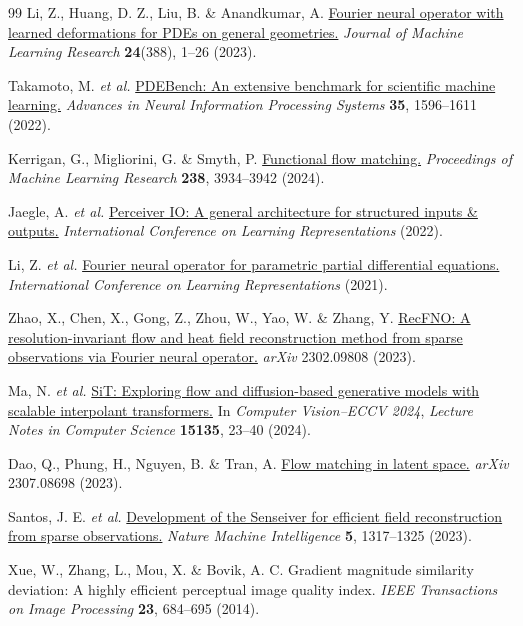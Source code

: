\documentclass[11pt]{article}
\begin{document}
\renewcommand{\refname}{Supplementary References}
{}
\begingroup
\small
\setlength{\parskip}{0pt}
\begin{thebibliography}{99}
 Li, Z., Huang, D. Z., Liu, B. \& Anandkumar, A. \href{https://www.jmlr.org/papers/v24/23-0064.html}{Fourier neural operator with learned deformations for PDEs on general geometries.} \emph{Journal of Machine Learning Research} \textbf{24}(388), 1--26 (2023).

 Takamoto, M. \emph{et al.} \href{https://arxiv.org/abs/2210.07182}{PDEBench: An extensive benchmark for scientific machine learning.} \emph{Advances in Neural Information Processing Systems} \textbf{35}, 1596--1611 (2022).

 Kerrigan, G., Migliorini, G. \& Smyth, P. \href{https://proceedings.mlr.press/v238/kerrigan24a.html}{Functional flow matching.} \emph{Proceedings of Machine Learning Research} \textbf{238}, 3934--3942 (2024).

 Jaegle, A. \emph{et al.} \href{https://arxiv.org/abs/2107.14795}{Perceiver IO: A general architecture for structured inputs \& outputs.} \emph{International Conference on Learning Representations} (2022).

 Li, Z. \emph{et al.} \href{https://openreview.net/forum?id=c8P9NQVtmnO}{Fourier neural operator for parametric partial differential equations.} \emph{International Conference on Learning Representations} (2021).

 Zhao, X., Chen, X., Gong, Z., Zhou, W., Yao, W. \& Zhang, Y. \href{https://arxiv.org/abs/2302.09808}{RecFNO: A resolution-invariant flow and heat field reconstruction method from sparse observations via Fourier neural operator.} \emph{arXiv} 2302.09808 (2023).

 Ma, N. \emph{et al.} \href{https://arxiv.org/abs/2401.08740}{SiT: Exploring flow and diffusion-based generative models with scalable interpolant transformers.} In \emph{Computer Vision--ECCV 2024}, \emph{Lecture Notes in Computer Science} \textbf{15135}, 23--40 (2024).

 Dao, Q., Phung, H., Nguyen, B. \& Tran, A. \href{https://arxiv.org/abs/2307.08698}{Flow matching in latent space.} \emph{arXiv} 2307.08698 (2023).

 Santos, J. E. \emph{et al.} \href{https://doi.org/10.1038/s42256-023-00746-x}{Development of the Senseiver for efficient field reconstruction from sparse observations.} \emph{Nature Machine Intelligence} \textbf{5}, 1317--1325 (2023).

 Xue, W., Zhang, L., Mou, X. \& Bovik, A. C. Gradient magnitude similarity deviation: A highly efficient perceptual image quality index. \emph{IEEE Transactions on Image Processing} \textbf{23}, 684--695 (2014).
\end{thebibliography}
\endgroup
\end{document}
